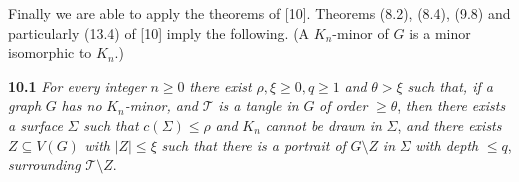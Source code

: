 
Finally we are able to apply the theorems of [10]. Theorems (8.2), (8.4), (9.8) and particularly (13.4) of [10] imply the following. (A $K_n$-minor of $G$ is a minor isomorphic to $K_n$.)

\textbf{10.1} \textit{For every integer} $n \ge 0$ \textit{there exist} $\rho, \xi \ge 0, q \ge 1$ \textit{and} $\theta > \xi$ \textit{such that, if a graph} $G$ \textit{has no} $K_n$\textit{-minor, and} $\mathcal{T}$ \textit{is a tangle in} $G$ \textit{of order} $\ge \theta$, \textit{then there exists a surface} $\Sigma$ \textit{such that} $c(\Sigma) \le \rho$ \textit{and} $K_n$ \textit{cannot be drawn in} $\Sigma$, \textit{and there exists} $Z \subseteq V(G)$ \textit{with} $|Z| \le \xi$ \textit{such that there is a portrait of} $G \setminus Z$ \textit{in} $\Sigma$ \textit{with depth} $\le q$, \textit{surrounding} $\mathcal{T} \setminus Z$.
